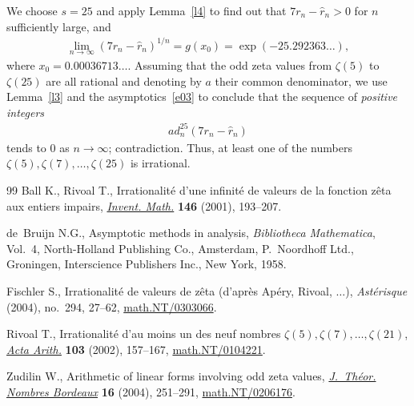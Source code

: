 \documentclass[11pt]{article}
\begin{document}
We choose $s=25$ and apply Lemma~\ref{l4} to find out that $7r_n-\hat r_n>0 $ for $n$ sufficiently large, and
\begin{gather*}
\lim_{n\to\infty}(7r_n-\hat r_n)^{1/n}=g(x_0)=\exp(-25.292363\dots),
\end{gather*}
where $x_0=0.00036713\dots$. Assuming that the odd zeta values from $\zeta(5)$ to $\zeta(25)$ are all rational and denoting by $a$ their common denominator, we use Lemma~\ref{l3} and the asymptotics~\eqref{e03} to conclude that the sequence of \emph{positive integers}
\begin{gather*}
ad_n^{25}(7r_n-\hat r_n)
\end{gather*}
tends to $0$ as $n\to\infty$; contradiction. Thus, at least one of the numbers $\zeta(5),\zeta(7),\dots,\allowbreak\zeta(25)$ is irrational.
\begin{thebibliography}{99}
Ball K., Rivoal T., Irrationalit\'e d'une infinit\'e de valeurs de la fonction
 z\^eta aux entiers impairs, \href{https://doi.org/10.1007/s002220100168}{\textit{Invent. Math.}} \textbf{146} (2001),
 193--207.

de~Bruijn N.G., Asymptotic methods in analysis, \textit{Bibliotheca
 Mathematica}, Vol.~4, North-Holland Publishing Co., Amsterdam, P.~Noordhoff
 Ltd., Groningen, Interscience Publishers Inc., New York, 1958.

Fischler S., Irrationalit\'e de valeurs de z\^eta (d'apr\`es {A}p\'ery,
 {R}ivoal, {$\dots$}), \textit{Ast\'erisque} (2004), no.~294, 27--62,
 \href{https://arxiv.org/abs/math.NT/0303066}{math.NT/0303066}.

Rivoal T., Irrationalit\'e d'au moins un des neuf nombres
 {$\zeta(5),\zeta(7),\dots,\zeta(21)$}, \href{https://doi.org/10.4064/aa103-2-5}{\textit{Acta Arith.}} \textbf{103}
 (2002), 157--167, \href{https://arxiv.org/abs/math.NT/0104221}{math.NT/0104221}.

Zudilin W., Arithmetic of linear forms involving odd zeta values,
 \href{https://doi.org/10.5802/jtnb.447}{\textit{J.~Th\'eor. Nombres Bordeaux}} \textbf{16} (2004), 251--291,
 \href{https://arxiv.org/abs/math.NT/0206176}{math.NT/0206176}.

\end{thebibliography}
\end{document}
